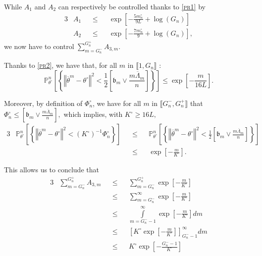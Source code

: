 While $A_{1}$ and $A_{2}$ can respectively be controlled thanks to \textsc{\cref{pr1}} by
\begin{alignat*}{3}
& A_{1} &&\leq && \exp\left[-\frac{5 m_{n}^{\circ}}{9 L} + \log\left(G_{n}\right)\right]\\
& A_{2} && \leq && \exp\left[-\frac{7 m_{n}^{\circ}}{9} + \log\left(G_{n}\right)\right],
\end{alignat*}
we now have to control $\sum\limits_{m = G_{n}^{-}}^{G_{n}^{+}}A_{3, m}$.

Thanks to \textsc{\cref{pr2}}, we have that, for all $m$ in $\llbracket 1, G_{n} \rrbracket$ :
\[\mathds{P}_{\theta^{\circ}}^{n}\left[\left\{\left\Vert \overline{\theta}^{m} - \theta^{\circ}\right\Vert^{2} < \frac{1}{2} \left[\mathfrak{b}_{m} \vee \frac{m \overline{\Lambda}_{m}}{n}\right]\right\}\right] \leq \exp\left[-\frac{m}{16 L}\right].\]

\medskip

Moreover, by definition of $\Phi_{n}^{\circ}$, we have for all $m$ in $\llbracket G_{n}^{-}, G_{n}^{+}\rrbracket$ that $\Phi_{n}^{\circ} \leq \left[\mathfrak{b}_{m} \vee \frac{m \overline{\Lambda}_{m}}{n}\right],$ which implies, with $K^{\circ} \geq 16 L,$
\begin{alignat*}{3}
& \mathds{P}_{\theta^{\circ}}^{n}\left[\left\{\left\Vert \overline{\theta}^{m} - \theta^{\circ}\right\Vert^{2} < \left(K^{\circ}\right)^{-1} \Phi_{n}^{\circ}\right\}\right] && \leq && \mathds{P}_{\theta^{\circ}}^{n}\left[\left\{\left\Vert \overline{\theta}^{m} - \theta^{\circ}\right\Vert^{2} < \frac{1}{2} \left[\mathfrak{b}_{m} \vee \frac{m \overline{\Lambda}_{m}}{n}\right]\right\}\right]\\
& && \leq && \exp\left[-\frac{m}{K^{\circ}}\right].
\end{alignat*}

This allows us to conclude that
\begin{alignat*}{3}
& \sum\limits_{m = G_{n}^{-}}^{G_{n}^{+}} A_{3, m} && \leq && \sum\limits_{m = G_{n}^{-}}^{G_{n}^{+}} \exp\left[-\frac{m}{K^{\circ}}\right]\\
& && \leq && \sum\limits_{m = G_{n}^{-}}^{\infty} \exp\left[-\frac{m}{K^{\circ}}\right]\\
& && \leq && \int\limits_{m = G_{n}^{-}-1}^{\infty} \exp\left[-\frac{m}{K^{\circ}}\right] dm\\
& && \leq && \left[K^{\circ} \exp\left[-\frac{m}{K^{\circ}}\right]\right]_{G_{n}^{-}-1}^{\infty} dm\\
& && \leq && K^{\circ} \exp\left[-\frac{G_{n}^{-} - 1}{K^{\circ}}\right]
\end{alignat*}

